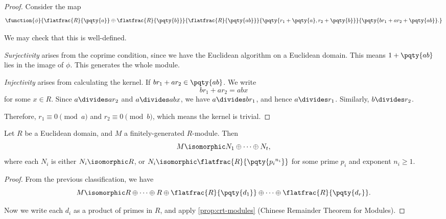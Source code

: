\begin{proof}
    Consider the map
    \[
        \function{\phi}{\flatfrac{R}{\pqty{a}} \oplus \flatfrac{R}{\pqty{b}}}{\flatfrac{R}{\pqty{ab}}}{\pqty{r_1 + \pqty{a}, r_2 + \pqty{b}}}{\pqty{b r_1 + a r_2 + \pqty{ab}}.}
    \]

    We may check that this is well-defined.

    \emph{Surjectivity} arises from the coprime condition, since we have the Euclidean algorithm on a Euclidean domain. This means \(1 + \pqty{ab}\) lies in the image of \(\phi\). This generates the whole module.

    \emph{Injectivity} arises from calculating the kernel. If \(b r_1 + a r_2 \in \pqty{ab}\). We write
    \[
        b r_1 + a r_2 = a b x
    \]
    for some \(x \in R\). Since \(a \divides a r_2\) and \(a \divides a b x\), we have \(a \divides b r_1\), and hence \(a \divides r_1\). Similarly, \(b \divides r_2\).

    Therefore, \(r_1 \equiv 0 \pmod a\) and \(r_2 \equiv 0 \pmod b\), which means the kernel is trivial.
\end{proof}

\begin{theorem}
    \label{thm:primary-decomposition-classification}%
    Let \(R\) be a Euclidean domain, and \(M\) a finitely-generated \(R\)-module. Then
    \[
        M \isomorphic N_1 \oplus \cdots \oplus N_t,
    \]
    where each \(N_i\) is either \(N_i \isomorphic R\), or \(N_i \isomorphic \flatfrac{R}{\pqty{{p_i}^{n_i}}}\) for some prime \(p_i\) and exponent \(n_i \geq 1\).
\end{theorem}

\begin{proof}
    From the previous classification, we have
    \[
        M \isomorphic R \oplus \cdots \oplus R \oplus \flatfrac{R}{\pqty{d_1}} \oplus \cdots \oplus \flatfrac{R}{\pqty{d_r}}.
    \]

    Now we write each \(d_i\) as a product of primes in \(R\), and apply \autoref{prop:crt-modules} (Chinese Remainder Theorem for Modules).
\end{proof}